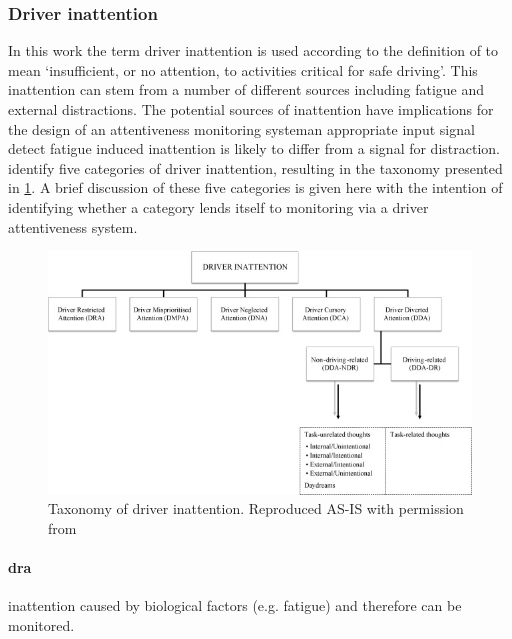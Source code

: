 \documentclass[11pt, parskip=half*,twoside=false]{scrbook}
\begin{document}
\subsubsection{Driver inattention}
In this work the term driver inattention is used according to the definition of \citet{reganDriverDistractionDriver2011} to mean `insufficient, or no attention, to activities critical for safe driving'. This inattention can stem from a number of different sources including fatigue and external distractions. The potential sources of inattention have implications for the design of an attentiveness monitoring system\textemdash an appropriate input signal detect fatigue induced inattention is likely to differ from a signal for distraction.  \citet{reganDriverDistractionDriver2011} identify five categories of driver inattention, resulting in the taxonomy presented in \cref{fig:taxonomy_inattention}. A brief discussion of these five categories is given here with the intention of identifying whether a category lends itself to monitoring via a driver attentiveness system. 

\begin{figure} 
	\centering
	\includegraphics[width=\textwidth]{driver_inattention_taxonomy} 
	\caption{Taxonomy of driver inattention. Reproduced AS-IS with permission from \citep{reganDriverDistractionDriver2011}}
	\label{fig:taxonomy_inattention}
\end{figure}

\paragraph{\gls{dra}} inattention caused by biological factors (e.g. fatigue) and therefore can be monitored.
\end{document}
